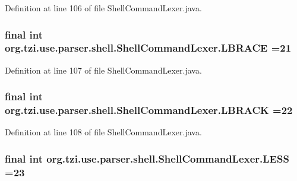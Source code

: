 Definition at line 106 of file Shell\-Command\-Lexer.\-java.

\hypertarget{classorg_1_1tzi_1_1use_1_1parser_1_1shell_1_1_shell_command_lexer_abd583ca24624f148f8f3889869c95565}{
\subsubsection[{L\-B\-R\-A\-C\-E}]{\setlength{\rightskip}{0pt plus 5cm}final int org.\-tzi.\-use.\-parser.\-shell.\-Shell\-Command\-Lexer.\-L\-B\-R\-A\-C\-E =21\hspace{0.3cm}{\ttfamily [static]}}}\label{classorg_1_1tzi_1_1use_1_1parser_1_1shell_1_1_shell_command_lexer_abd583ca24624f148f8f3889869c95565}


Definition at line 107 of file Shell\-Command\-Lexer.\-java.

\hypertarget{classorg_1_1tzi_1_1use_1_1parser_1_1shell_1_1_shell_command_lexer_aba5a443b6375ce158f7f3d3ef0b45da4}{
\subsubsection[{L\-B\-R\-A\-C\-K}]{\setlength{\rightskip}{0pt plus 5cm}final int org.\-tzi.\-use.\-parser.\-shell.\-Shell\-Command\-Lexer.\-L\-B\-R\-A\-C\-K =22\hspace{0.3cm}{\ttfamily [static]}}}\label{classorg_1_1tzi_1_1use_1_1parser_1_1shell_1_1_shell_command_lexer_aba5a443b6375ce158f7f3d3ef0b45da4}


Definition at line 108 of file Shell\-Command\-Lexer.\-java.

\hypertarget{classorg_1_1tzi_1_1use_1_1parser_1_1shell_1_1_shell_command_lexer_aecca9d5a2a20056a8da9a380752e4caa}{
\subsubsection[{L\-E\-S\-S}]{\setlength{\rightskip}{0pt plus 5cm}final int org.\-tzi.\-use.\-parser.\-shell.\-Shell\-Command\-Lexer.\-L\-E\-S\-S =23\hspace{0.3cm}{\ttfamily [static]}}}\label{classorg_1_1tzi_1_1use_1_1parser_1_1shell_1_1_shell_command_lexer_aecca9d5a2a20056a8da9a380752e4caa}


